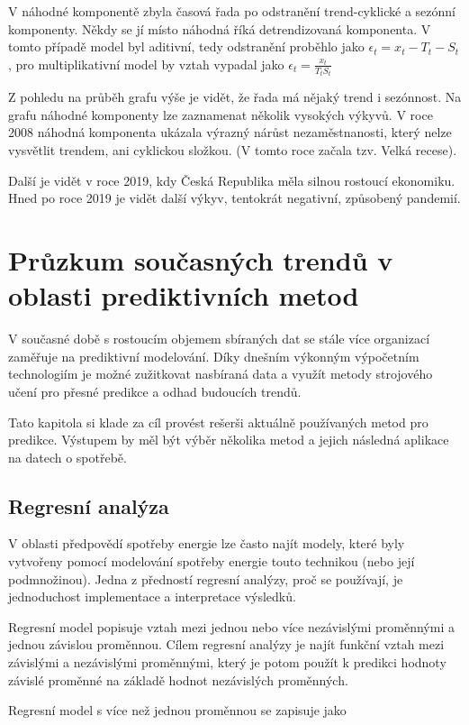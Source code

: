 \documentclass[FM,BP,fonts]{tulthesis}
\begin{document}
V náhodné komponentě zbyla časová řada po odstranění trend-cyklické a sezónní komponenty. Někdy se jí místo náhodná říká detrendizovaná komponenta. V tomto případě model byl aditivní, tedy odstranění proběhlo jako $\epsilon_t = x_t - T_t - S_t$, pro multiplikativní model by vztah vypadal jako $\epsilon_t = \frac{x_t}{T_tS_t}$

Z pohledu na průběh grafu výše je vidět, že řada má nějaký trend i sezónnost. Na grafu náhodné komponenty lze zaznamenat několik vysokých výkyvů. V roce 2008 náhodná komponenta ukázala výrazný nárůst nezaměstnanosti, který nelze vysvětlit trendem, ani cyklickou složkou. (V tomto roce začala tzv. Velká recese).

 Další je vidět v roce 2019, kdy Česká Republika měla silnou rostoucí ekonomiku. Hned po roce 2019 je vidět další výkyv, tentokrát negativní, způsobený pandemií.

\chapter{Průzkum současných trendů v oblasti prediktivních metod}
V současné době s rostoucím objemem sbíraných dat se stále více organizací zaměřuje na prediktivní modelování. Díky dnešním výkonným výpočetním technologiím je možné zužitkovat nasbíraná data a využít metody strojového učení pro přesné predikce a odhad budoucích trendů.

Tato kapitola si klade za cíl provést rešerši aktuálně používaných metod pro predikce. Výstupem by měl být výběr několika metod a jejich následná aplikace na datech o spotřebě.

\section{Regresní analýza}
V oblasti předpovědí spotřeby energie lze často najít modely, které byly vytvořeny pomocí modelování spotřeby energie touto technikou (nebo její podmnožinou). Jedna z předností regresní analýzy, proč se používají, je jednoduchost implementace a interpretace výsledků.

Regresní model popisuje vztah mezi jednou nebo více nezávislými proměnnými a jednou závislou proměnnou. Cílem regresní analýzy je najít funkční vztah mezi závislými a nezávislými proměnnými, který je potom použít k predikci hodnoty závislé proměnné na základě hodnot nezávislých proměnných.

Regresní model s více než jednou proměnnou se zapisuje jako
\end{document}
